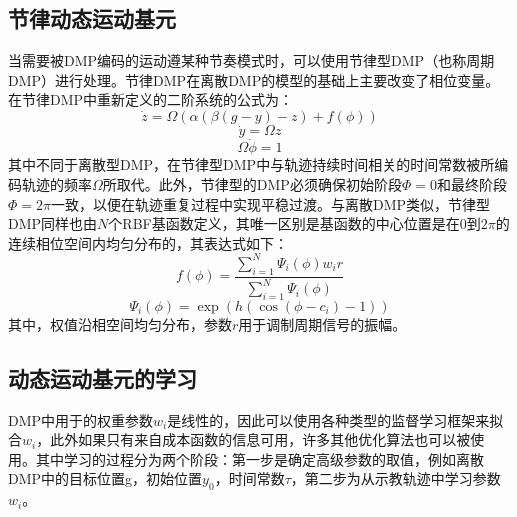 \subsection{节律动态运动基元}
当需要被DMP编码的运动遵某种节奏模式时，可以使用节律型DMP（也称周期DMP）进行处理。节律DMP在离散DMP的模型的基础上主要改变了相位变量。在节律DMP中重新定义的二阶系统的公式为：
\begin{equation}
    \dot{z}=\Omega(\alpha(\beta(g-y)-z)+f(\phi))
    \label{eq:2-8}
\end{equation}
\begin{equation}
    \dot{y}=\Omega z
    \label{eq:2-9}
\end{equation}
\begin{equation}
    \Omega \dot{\phi}=1
    \label{eq:2-10}
\end{equation}
其中不同于离散型DMP，在节律型DMP中与轨迹持续时间相关的时间常数被所编码轨迹的频率$\Omega$所取代。此外，节律型的DMP必须确保初始阶段$\Phi = 0$和最终阶段$\Phi = 2\pi$一致，以便在轨迹重复过程中实现平稳过渡。与离散DMP类似，节律型DMP同样也由$N$个RBF基函数定义，其唯一区别是基函数的中心位置是在0到$2\pi$的连续相位空间内均匀分布的，其表达式如下：
\begin{equation}
    f(\phi)=\frac{\sum_{i=1}^N \Psi_i(\phi) w_i r}{\sum_{i=1}^N \Psi_i(\phi)}
    \label{eq:2-11}
\end{equation}
\begin{equation}
    \Psi_i(\phi)=\exp \left(h\left(\cos \left(\phi-c_i\right)-1\right)\right)
    \label{eq:2-12}
\end{equation}
其中，权值沿相空间均匀分布，参数$r$用于调制周期信号的振幅。
\subsection{动态运动基元的学习}
DMP中用于的权重参数$w_i$是线性的，因此可以使用各种类型的监督学习框架来拟合$w_i$，此外如果只有来自成本函数的信息可用，许多其他优化算法也可以被使用。其中学习的过程分为两个阶段\cite{saverianoDynamicMovementPrimitives2023}：第一步是确定高级参数的取值，例如离散DMP中的目标位置g，初始位置$y_0$，时间常数$τ$，第二步为从示教轨迹中学习参数$w_i$。

